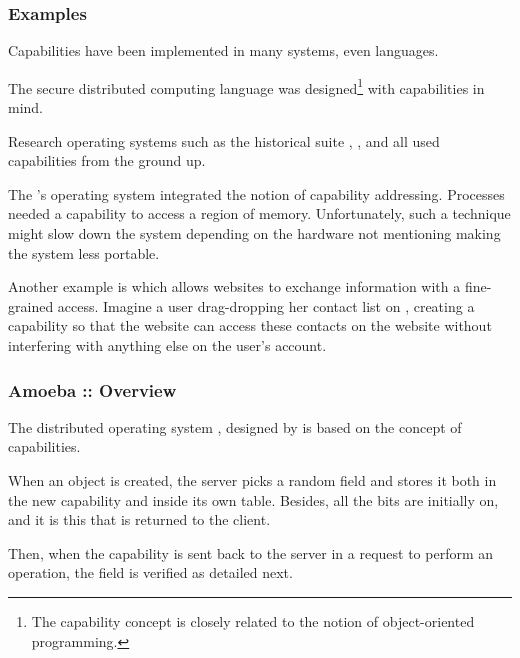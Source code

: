 
\begin{frame}
  \frametitle{Examples}

  Capabilities have been implemented in many systems, even languages.

  \-

  The secure distributed computing language  was
  designed\footnote{The capability concept is closely related to the notion
  of object-oriented programming.} with capabilities in mind.

  \-

  Research operating systems such as the historical suite ,
  ,  and  all used capabilities from
  the ground up.

  \-

  The 's operating system  integrated the notion
  of capability addressing. Processes needed a capability to access a region
  of memory. Unfortunately, such a technique might slow down the system
  depending on the hardware not mentioning making the system less portable.

  \-

  Another example is   which allows websites to
  exchange information with a fine-grained access. Imagine a user drag-dropping
  her  contact list on , creating a capability
  so that the  website can access these contacts on the
   website without interfering with anything else on the user's
   account.
\end{frame}


\begin{frame}
  \frametitle{Amoeba :: Overview}

  The distributed operating system , designed by
    is based on the concept of
  capabilities.

  \-

  \begin{center}
  \end{center}

  \-

  When an object is created, the server picks a random  field and
  stores it both in the new capability and inside its own table. Besides,
  all the  bits are initially on, and it is this  that is returned to the client.

  \-
  
  Then, when the capability is sent back to the server in a request to perform
  an operation, the  field is verified as detailed next.
\end{frame}

